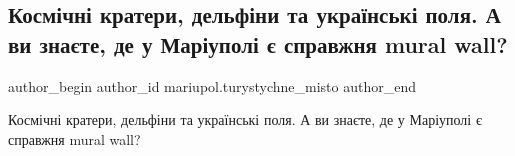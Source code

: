  
 
 
 
 

\subsection{Космічні кратери, дельфіни та українські поля. А ви знаєте, де у Маріуполі є справжня mural wall?}
\label{sec:09_05_2019.fb.mariupol.turystychne_misto.1.spravzhnja_mural_wall}

\ifcmt
 author_begin
   author_id mariupol.turystychne_misto
 author_end
\fi

Космічні кратери, дельфіни та українські поля. А ви знаєте, де у Маріуполі є справжня mural wall?
